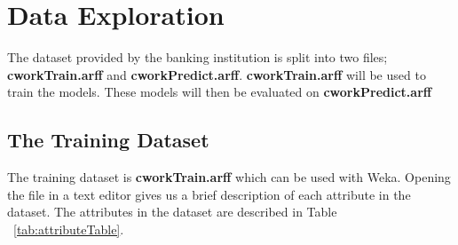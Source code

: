 \documentclass[a4paper,11pt]{article}
\begin{document}
\section{Data Exploration}

The dataset provided by the banking institution is split into two files; \textbf{cworkTrain.arff} and
\textbf{cworkPredict.arff}. \textbf{cworkTrain.arff} will be used to train the models. These models
will then be evaluated on \textbf{cworkPredict.arff}

\subsection{The Training Dataset}

The training dataset is \textbf{cworkTrain.arff} which can be used with Weka. Opening
the file in a text editor gives us a brief description of each attribute in the dataset.
The attributes in the dataset are described in Table ~\ref{tab:attributeTable}.
\end{document}
